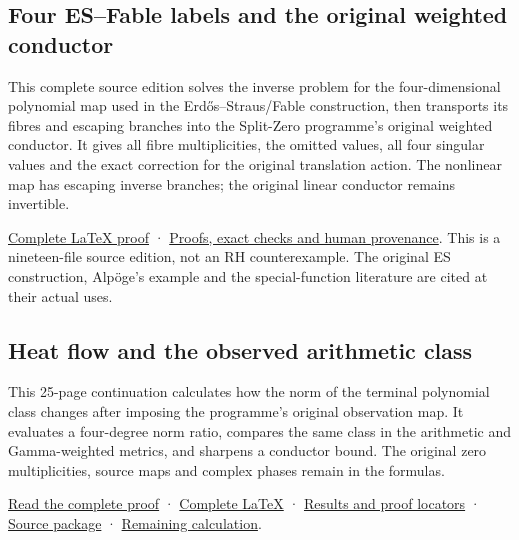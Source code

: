 \documentclass[
]{article}
\begin{document}
\subsection{Four ES--Fable labels and the original weighted
conductor}\label{four-esfable-labels-and-the-original-weighted-conductor}

This complete source edition solves the inverse problem for the
four-dimensional polynomial map used in the Erdős--Straus/Fable
construction, then transports its fibres and escaping branches into the
Split-Zero programme's original weighted conductor. It gives all fibre
multiplicities, the omitted values, all four singular values and the
exact correction for the original translation action. The nonlinear map
has escaping inverse branches; the original linear conductor remains
invertible.

\href{https://github.com/KokunoYumeto/zeta-function-research-reader/blob/main/workbenches/splitzero-tandem/continuations/20260920-fable-conductor/FABLE_TO_ORIGINAL_CONDUCTOR.tex}{Complete
LaTeX proof} ·
\href{https://github.com/KokunoYumeto/zeta-function-research-reader/blob/main/workbenches/splitzero-tandem/continuations/20260920-fable-conductor/README.md}{Proofs,
exact checks and human provenance}. This is a nineteen-file source
edition, not an RH counterexample. The original ES construction,
Alpöge's example and the special-function literature are cited at their
actual uses.

\subsection{Heat flow and the observed arithmetic
class}\label{heat-flow-and-the-observed-arithmetic-class}

This 25-page continuation calculates how the norm of the terminal
polynomial class changes after imposing the programme's original
observation map. It evaluates a four-degree norm ratio, compares the
same class in the arithmetic and Gamma-weighted metrics, and sharpens a
conductor bound. The original zero multiplicities, source maps and
complex phases remain in the formulas.

\href{https://github.com/KokunoYumeto/zeta-function-research-reader/blob/main/workbenches/splitzero-tandem/continuations/20260920-heat-literature-observed-class/HEAT_LITERATURE_AND_OBSERVED_CLASS.pdf}{Read
the complete proof} ·
\href{https://github.com/KokunoYumeto/zeta-function-research-reader/blob/main/workbenches/splitzero-tandem/continuations/20260920-heat-literature-observed-class/HEAT_LITERATURE_AND_OBSERVED_CLASS.tex}{Complete
LaTeX} ·
\href{https://github.com/KokunoYumeto/zeta-function-research-reader/blob/main/workbenches/splitzero-tandem/continuations/20260920-heat-literature-observed-class/NEW_RESULTS_2026-09-20.md}{Results
and proof locators} ·
\href{https://github.com/KokunoYumeto/zeta-function-research-reader/blob/main/workbenches/splitzero-tandem/continuations/20260920-heat-literature-observed-class/README.md}{Source
package} ·
\href{https://github.com/KokunoYumeto/zeta-function-research-reader/blob/main/workbenches/splitzero-tandem/continuations/20260920-heat-literature-observed-class/CONTINUATION.md}{Remaining
calculation}.
\end{document}
